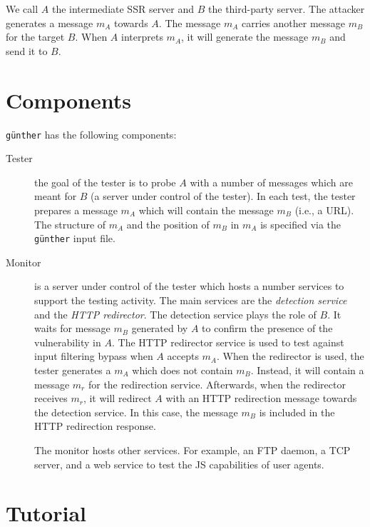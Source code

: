 \documentclass[10pt,a4paper]{article}
\newcommand{\g}{\texttt{g\"{u}nther}}
\begin{document}
We call $A$ the intermediate SSR server and $B$ the third-party server. The
attacker generates a message $m_A$ towards $A$. The message $m_A$ carries
another message $m_B$ for the target $B$. When $A$ interprets $m_A$, it will
generate the message $m_B$ and send it to $B$.

\section{Components}

\g{} has the following components:

\begin{description}

  \item[Tester] the goal of the tester is to probe $A$ with a number of messages
  which are meant for $B$ (a server under control of the tester). In each test,
  the tester prepares a message $m_A$ which will contain the message $m_B$
  (i.e., a URL). The structure of $m_A$ and the position of $m_B$ in $m_A$ is
  specified via the \g{} input file.

  \item[Monitor] is a server under control of the tester which hosts a number
  services to support the testing activity. The main services are the
  \emph{detection service} and the \emph{HTTP redirector}. The detection service
  plays the role of $B$. It waits for message $m_B$ generated by $A$ to confirm
  the presence of the vulnerability in $A$. The HTTP redirector service is used
  to test against input filtering bypass when $A$ accepts $m_A$. When the
  redirector is used, the tester generates a $m_A$ which does not contain $m_B$.
  Instead, it will contain a message $m_r$ for the redirection service.
  Afterwards, when the redirector receives $m_r$, it will redirect $A$ with an
  HTTP redirection message towards the detection service. In this case, the
  message $m_B$ is included in the HTTP redirection response.
  
  The monitor hosts other services. For example, an FTP daemon, a TCP server,
  and a web service to test the JS capabilities of user agents.

\end{description}




\section{Tutorial}
\end{document}
